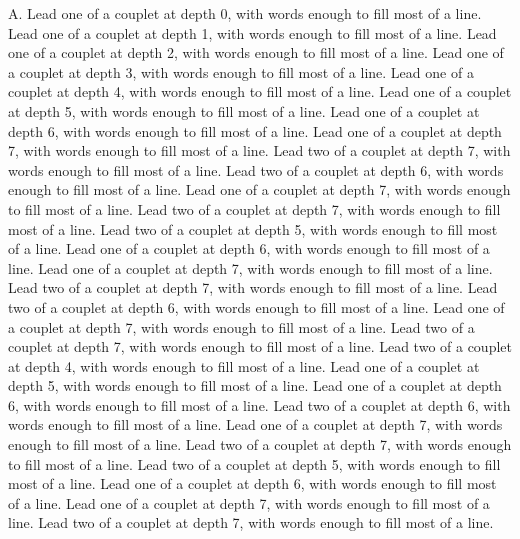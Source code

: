 \documentclass[a4paper]{article}
\begin{document}
\begin{Key}{A. }
\alter Lead one of a couplet at depth 0, with words enough to fill most of a line.
\alter Lead one of a couplet at depth 1, with words enough to fill most of a line.
\alter Lead one of a couplet at depth 2, with words enough to fill most of a line.
\alter Lead one of a couplet at depth 3, with words enough to fill most of a line.
\alter Lead one of a couplet at depth 4, with words enough to fill most of a line.
\alter Lead one of a couplet at depth 5, with words enough to fill most of a line.
\alter Lead one of a couplet at depth 6, with words enough to fill most of a line.
\alter Lead one of a couplet at depth 7, with words enough to fill most of a line.
\alter Lead two of a couplet at depth 7, with words enough to fill most of a line.
\alter Lead two of a couplet at depth 6, with words enough to fill most of a line.
\alter Lead one of a couplet at depth 7, with words enough to fill most of a line.
\alter Lead two of a couplet at depth 7, with words enough to fill most of a line.
\alter Lead two of a couplet at depth 5, with words enough to fill most of a line.
\alter Lead one of a couplet at depth 6, with words enough to fill most of a line.
\alter Lead one of a couplet at depth 7, with words enough to fill most of a line.
\alter Lead two of a couplet at depth 7, with words enough to fill most of a line.
\alter Lead two of a couplet at depth 6, with words enough to fill most of a line.
\alter Lead one of a couplet at depth 7, with words enough to fill most of a line.
\alter Lead two of a couplet at depth 7, with words enough to fill most of a line.
\alter Lead two of a couplet at depth 4, with words enough to fill most of a line.
\alter Lead one of a couplet at depth 5, with words enough to fill most of a line.
\alter Lead one of a couplet at depth 6, with words enough to fill most of a line.
\alter Lead two of a couplet at depth 6, with words enough to fill most of a line.
\alter Lead one of a couplet at depth 7, with words enough to fill most of a line.
\alter Lead two of a couplet at depth 7, with words enough to fill most of a line.
\alter Lead two of a couplet at depth 5, with words enough to fill most of a line.
\alter Lead one of a couplet at depth 6, with words enough to fill most of a line.
\alter Lead one of a couplet at depth 7, with words enough to fill most of a line.
\alter Lead two of a couplet at depth 7, with words enough to fill most of a line.

\end{Key}
\end{document}
